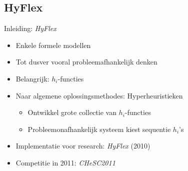 \documentclass[handout]{beamer}
\begin{document}
\subsection{HyFlex}
\begin{frame}{Inleiding: \emph{HyFlex}}
\begin{itemize}[<+->]
 \item Enkele formele modellen
 \item Tot dusver vooral probleemafhankelijk denken
 \item Belangrijk: $h_i$-functies
 \item Naar algemene oplossingsmethodes: Hyperheuristieken
 \begin{itemize}
   \item Ontwikkel grote collectie van $h_i$-functies
   \item Probleemonafhankelijk systeem kiest sequentie $h_i$'s
 \end{itemize}
 \item Implementatie voor research: \emph{HyFlex} (2010)
 \item Competitie in 2011: \emph{CHeSC2011}
\end{itemize}
\end{frame}
\end{document}
